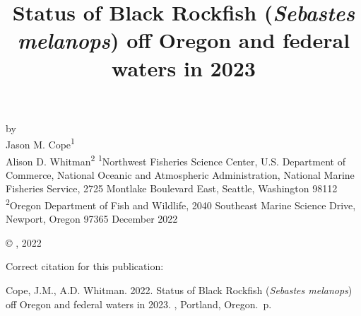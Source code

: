 \documentclass[11pt,
  english,
  letterpaper,
]{article}
\date{}
\newcommand{\trTitle}{Status of Black Rockfish (\emph{Sebastes melanops}) off Oregon and federal waters in 2023}
\newcommand{\trYear}{2022}
\newcommand{\trMonth}{December}
\newcommand{\trAuthsBack}{Cope, J.M., A.D. Whitman}
\newcommand{\trCitation}{
\begin{hangparas}{1em}{1}
\trAuthsBack{}. \trYear{}. \trTitle{}. \glsentrylong{pfmc}, Portland, Oregon. \pageref{LastPage}{}\,p.
\end{hangparas}}
\begin{document}

\renewcommand*{\thefootnote}{\fnsymbol{footnote}}

\small
\thispagestyle{empty}
\noindent
\begin{center}
\title{Status of Black Rockfish (\emph{Sebastes melanops}) off Oregon and federal waters in 2023}
\vspace{1.5cm}
{\Large\textbf{}}
\vfill
by\\
Jason M. Cope\textsuperscript{1}\\
Alison D. Whitman\textsuperscript{2}\vfill
\textsuperscript{1}Northwest Fisheries Science Center, U.S. Department of Commerce, National Oceanic and Atmospheric Administration, National Marine Fisheries Service, 2725 Montlake Boulevard East, Seattle, Washington 98112\\
\textsuperscript{2}Oregon Department of Fish and Wildlife, 2040 Southeast Marine Science Drive, Newport, Oregon 97365\vfill
\trMonth{} \trYear{}
\end{center}
\clearpage

\thispagestyle{empty}
\vspace*{\fill}
\begin{center}
\copyright{} , \trYear{}\\
\end{center}
\par
\bigskip
\noindent
Correct citation for this publication:
\bigskip
\par
\trCitation{}
\clearpage


\tableofcontents\clearpage
\label{TRlastRoman}
\clearpage

\newpage
\thispagestyle{empty} %

\pagestyle{plain}  %
\renewcommand*{\thefootnote}{\arabic{footnote}}  %
\setcounter{footnote}{0}  %
\renewcommand{\headrulewidth}{0.5pt}
\renewcommand{\footrulewidth}{0.5pt}
\end{document}
